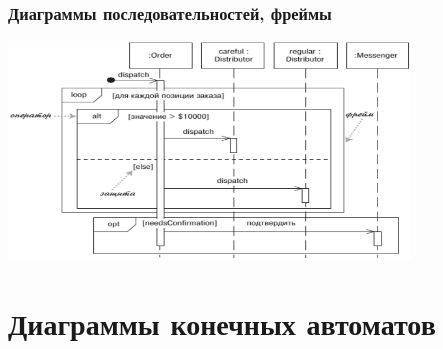 \documentclass[xetex,mathserif,serif]{beamer}
\begin{document}
    \begin{frame}
        \frametitle{Диаграммы последовательностей, фреймы}
        \begin{center}
            \includegraphics[width=0.8\textwidth]{sequenceFrames.png}
        \end{center}
    \end{frame}

    \section{Диаграммы конечных автоматов}
\end{document}
